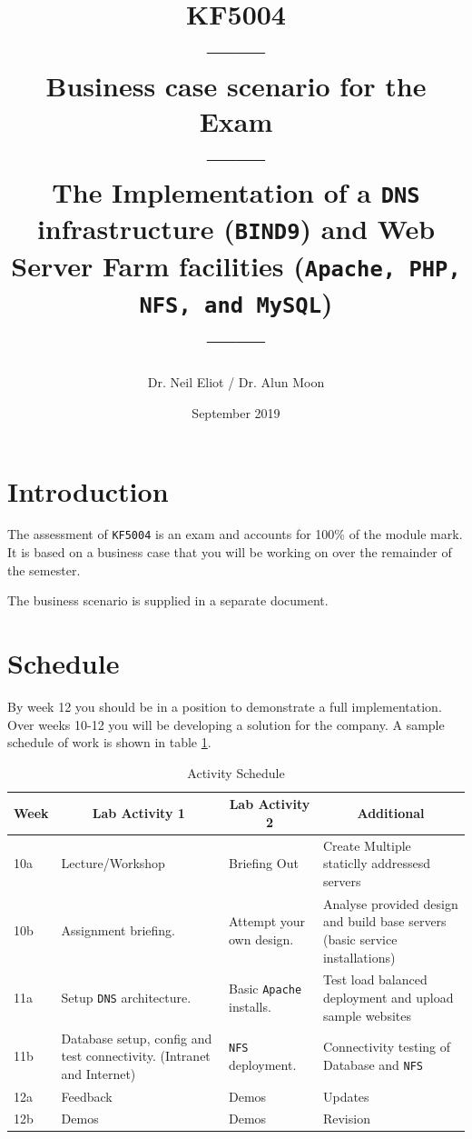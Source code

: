 \documentclass[11pt]{article}
\begin{document}
\author{Dr. Neil Eliot / Dr. Alun Moon}
\title{KF5004\\------\\Business case scenario for the Exam\\------\\The Implementation of a \texttt{DNS} infrastructure (\texttt{BIND9}) and Web Server Farm facilities
(\texttt{Apache, PHP, NFS, and MySQL})\\------}
\date{September 2019}
\maketitle

\newpage
\tableofcontents
\newpage

\section{Introduction}
The assessment of \texttt{KF5004} is an exam and accounts for 100\% of the module mark. It is based on a business case that you will be working on over the remainder of the semester.

The business scenario is supplied in a separate document. 

\section{Schedule}
By week 12 you should be in a position to demonstrate a full implementation. Over weeks 10-12 you will be developing a solution for the company. 
A sample schedule of work is shown in table \ref{schedule}.

\begin{table}[ht]\label{schedule}
    \begin{tabular}{|p{1cm}|p{5cm}|p{5cm}|p{5cm}|} 
      \hline
      \multicolumn{1}{|c|}{Week} & \multicolumn{1}{|c|}{Lab Activity 1} & \multicolumn{1}{|c|}{Lab Activity 2}& \multicolumn{1}{|c|}{Additional} \\ 
      \hline
      10a & Lecture/Workshop& Briefing Out & Create Multiple staticlly addressesd servers\\
      \hline
      10b & Assignment briefing.& Attempt your own design.& Analyse provided design and build base servers (basic service installations)\\
      \hline
      11a & Setup \texttt{DNS} architecture.& Basic \texttt{Apache} installs. & Test load balanced deployment and upload sample websites\\
      \hline
      11b & Database setup, config and test connectivity. (Intranet and Internet)& \texttt{NFS} deployment.& Connectivity testing of Database and \texttt{NFS}\\
      \hline
      12a & Feedback & Demos & Updates\\
      \hline
      12b & Demos & Demos & Revision\\
      \hline
    \end{tabular}
    \caption{Activity Schedule}
\end{table}
\newpage 
\end{document}
